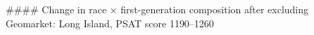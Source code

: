 #### Change in race × first-generation composition after excluding Geomarket: Long Island, PSAT score 1190–1260
